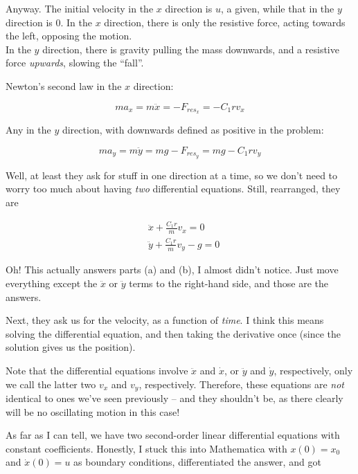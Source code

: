 \documentclass[8.01x]{subfiles}
\begin{document}
Anyway. The initial velocity in the $x$ direction is $u$, a given, while that in the $y$ direction is 0. In the $x$ direction, there is only the resistive force, acting towards the left, opposing the motion.\\
In the $y$ direction, there is gravity pulling the mass downwards, and a resistive force \emph{upwards}, slowing the ``fall''.

Newton's second law in the $x$ direction:

\begin{equation}
m a_x = m \ddot{x} = - F_{res_x} = - C_1 r v_x
\end{equation}

Any in the $y$ direction, with downwards defined as positive in the problem:

\begin{equation}
m a_y = m \ddot{y} = m g - F_{res_y} = m g - C_1 r v_y
\end{equation}

Well, at least they ask for stuff in one direction at a time, so we don't need to worry too much about having \emph{two} differential equations. Still, rearranged, they are

\begin{align}
&\ddot{x} + \frac{C_1 r}{m} v_x = 0\\
&\ddot{y} + \frac{C_1 r}{m} v_y - g = 0
\end{align}

Oh! This actually answers parts (a) and (b), I almost didn't notice. Just move everything except the $\ddot{x}$ or $\ddot{y}$ terms to the right-hand side, and those are the answers.

Next, they ask us for the velocity, as a function of \emph{time}. I think this means solving the differential equation, and then taking the derivative once (since the solution gives us the position).

Note that the differential equations involve $\ddot{x}$ and $\dot{x}$, or $\ddot{y}$ and $\dot{y}$, respectively, only we call the latter two $v_x$ and $v_y$, respectively. Therefore, these equations are \emph{not} identical to ones we've seen previously -- and they shouldn't be, as there clearly will be no oscillating motion in this case!

As far as I can tell, we have two second-order linear differential equations with constant coefficients. Honestly, I stuck this into Mathematica with $x(0) = x_0$ and $\dot{x}(0) = u$ as boundary conditions, differentiated the answer, and got
\end{document}

